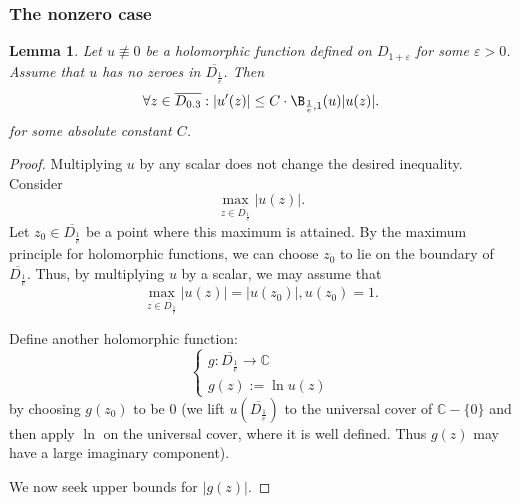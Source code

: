 \documentclass[reqno]{amsart}
\theoremstyle{plain}
\newtheorem{Lem}[Cor]{Lemma}
\theoremstyle{definition}
\theoremstyle{remark}
\theoremstyle{plain}
\begin{document}
\subsubsection{The nonzero case}

\begin{Lem}\label{Lemma derivative-function ratio unit}
Let $u\not\equiv 0$ be a holomorphic function defined on $D_{1+\varepsilon}$ for some $\varepsilon>0$. Assume that $u$ has no zeroes in $\overline{D_\frac1e}$. Then
\[
    \forall z\in\overline{D_{0.3}}:|u'(z)|\leq C\cdot\B_{\frac1e,1}(u)|u(z)|
.\]
for some absolute constant $C$.
\end{Lem}

\begin{proof}
Multiplying $u$ by any scalar does not change the desired inequality. Consider
\[
    \max_{z\in\overline{D_\frac1e}}|u(z)|
.\]
Let $z_0\in\overline{D_\frac1e}$ be a point where this maximum is attained. By the maximum principle for holomorphic functions, we can choose $z_0$ to lie on the boundary of $\overline{D_\frac1e}$. Thus, by multiplying $u$ by a scalar, we may assume that
\[
    \max_{z\in\overline{D_\frac1e}}|u(z)|=|u(z_0)|,u(z_0)=1
.\]

Define another holomorphic function:
\[
\begin{cases}
    g:\overline{D_\frac1e}\rightarrow\mathbb C
    \\g(z):=\ln u(z)
\end{cases}
\]
by choosing $g(z_0)$ to be $0$ (we lift $u(\overline{D_\frac1e})$ to the universal cover of $\mathbb C-\{0\}$ and then apply $\ln$ on the universal cover, where it is well defined. Thus $g(z)$ may have a large imaginary component).

We now seek upper bounds for $|g(z)|$.


\end{proof}
\end{document}
